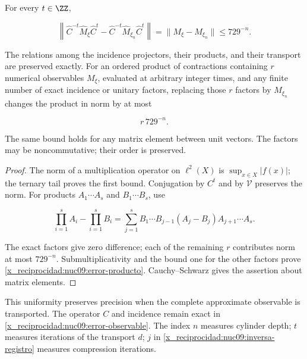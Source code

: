 \begin{theorem}
\label{x_reciprocidad:nuc09:precision}
For every \(t\in\ZZ\),



\begin{equation}
\boxed{
\left\|\widehat C^{-t}\widehat M_\xi\widehat C^t
-\widehat C^{-t}\widehat M_{\xi_n}\widehat C^t\right\|
=\|M_\xi-M_{\xi_n}\|\le729^{-n}.}
\label{x_reciprocidad:nuc09:error-observable}
\end{equation}



The relations among the incidence projectors, their products, and their transport are preserved exactly. For an ordered product of contractions containing \(r\) numerical observables \(M_\xi\), evaluated at arbitrary integer times, and any finite number of exact incidence or unitary factors, replacing those \(r\) factors by \(M_{\xi_n}\) changes the product in norm by at most



\begin{equation}
\boxed{r\,729^{-n}.}
\label{x_reciprocidad:nuc09:error-producto}
\end{equation}



The same bound holds for any matrix element between unit vectors. The factors may be noncommutative; their order is preserved.
\end{theorem}

\begin{proof}
The norm of a multiplication operator on \(\ell^2(X)\) is \(\sup_{x\in X}|f(x)|\); the ternary tail proves the first bound. Conjugation by \(C^t\) and by \(\mathcal V\) preserves the norm. For products \(A_1\cdots A_s\) and \(B_1\cdots B_s\), use



\[
\prod_{i=1}^s A_i-\prod_{i=1}^s B_i
=\sum_{j=1}^s B_1\cdots B_{j-1}(A_j-B_j)A_{j+1}\cdots A_s.
\]



The exact factors give zero difference; each of the remaining \(r\) contributes norm at most \(729^{-n}\). Submultiplicativity and the bound one for the other factors prove \eqref{x_reciprocidad:nuc09:error-producto}. Cauchy--Schwarz gives the assertion about matrix elements.
\end{proof}

This uniformity preserves precision when the complete approximate observable is transported. The operator \(C\) and incidence remain exact in \eqref{x_reciprocidad:nuc09:error-observable}. The index \(n\) measures cylinder depth; \(t\) measures iterations of the transport \(d\); \(j\) in \eqref{x_reciprocidad:nuc09:inversa-registro} measures compression iterations.

